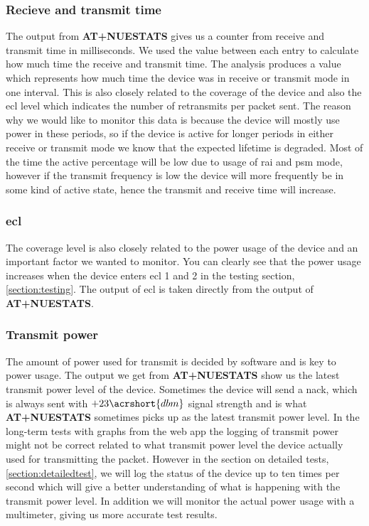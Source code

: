\documentclass[USenglish]{ifimaster}  %
\begin{document}
\subsubsection{Recieve and transmit time}
The output from \textbf{AT+NUESTATS} gives us a counter from receive and transmit time in milliseconds. We used the value between each entry to calculate how much time the receive and transmit time. The analysis produces a value which represents how much time the device was in receive or transmit mode in one interval. This is also closely related to the coverage of the device and also the \acrshort{ecl} level which indicates the number of retransmits per packet sent. The reason why we would like to monitor this data is because the device will mostly use power in these periods, so if the device is active for longer periods in either receive or transmit mode we know that the expected lifetime is degraded. Most of the time the active percentage will be low due to usage of \acrfull{rai} and \acrshort{psm} mode, however if the transmit frequency is low the device will more frequently be in some kind of active state, hence the transmit and receive time will increase.

\subsubsection{\acrshort{ecl}}
The coverage level is also closely related to the power usage of the device and an important factor we wanted to monitor. You can clearly see that the power usage increases when the device enters \acrshort{ecl} 1 and 2 in the testing section, \vref{section:testing}. The output of \acrshort{ecl} is taken directly from the output of \textbf{AT+NUESTATS}.

\subsubsection{Transmit power} \label{paragraph:txpower}
The amount of power used for transmit is decided by software and is key to power usage. The output we get from \textbf{AT+NUESTATS} show us the latest transmit power level of the device. Sometimes the device will send a \acrfull{nack}, which is always sent with ${+23 \acrshort{dbm}}$ signal strength and is what \textbf{AT+NUESTATS} sometimes picks up as the latest transmit power level\cite{email:nack}. In the long-term tests with graphs from the web app the logging of transmit power might not be correct related to what transmit power level the device actually used for transmitting the packet. However in the section on detailed tests, \vref{section:detailedtest}, we will log the status of the device up to ten times per second which will give a better understanding of what is happening with the transmit power level. In addition we will monitor the actual power usage with a multimeter, giving us more accurate test results.
\end{document}
